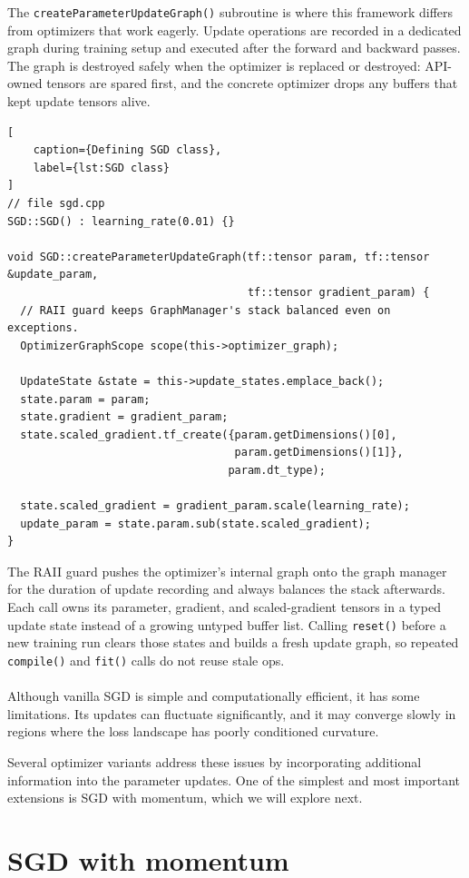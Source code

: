 The \texttt{createParameterUpdateGraph()} subroutine is where this framework
differs from optimizers that work eagerly. Update operations are recorded in a
dedicated graph during training setup and executed after the forward and
backward passes. The graph is destroyed safely when the optimizer is replaced or
destroyed: API-owned tensors are spared first, and the concrete optimizer drops
any buffers that kept update tensors alive.

\begin{lstlisting}[
    caption={Defining SGD class},
    label={lst:SGD class}
]
// file sgd.cpp
SGD::SGD() : learning_rate(0.01) {}

void SGD::createParameterUpdateGraph(tf::tensor param, tf::tensor &update_param,
                                     tf::tensor gradient_param) {
  // RAII guard keeps GraphManager's stack balanced even on exceptions.
  OptimizerGraphScope scope(this->optimizer_graph);

  UpdateState &state = this->update_states.emplace_back();
  state.param = param;
  state.gradient = gradient_param;
  state.scaled_gradient.tf_create({param.getDimensions()[0],
                                   param.getDimensions()[1]},
                                  param.dt_type);

  state.scaled_gradient = gradient_param.scale(learning_rate);
  update_param = state.param.sub(state.scaled_gradient);
}
\end{lstlisting}

The RAII guard pushes the optimizer's internal graph onto the graph manager for
the duration of update recording and always balances the stack afterwards. Each
call owns its parameter, gradient, and scaled-gradient tensors in a typed update
state instead of a growing untyped buffer list. Calling \texttt{reset()} before a
new training run clears those states and builds a fresh update graph, so
repeated \texttt{compile()} and \texttt{fit()} calls do not reuse stale ops.

\paragraph{}
Although vanilla SGD is simple and computationally
efficient, it has some limitations. Its updates can
fluctuate significantly, and it may converge slowly
in regions where the loss landscape has poorly
conditioned curvature.

Several optimizer variants address these issues by
incorporating additional information into the
parameter updates. One of the simplest and most
important extensions is SGD with momentum, which
we will explore next.


\section{SGD with momentum}

